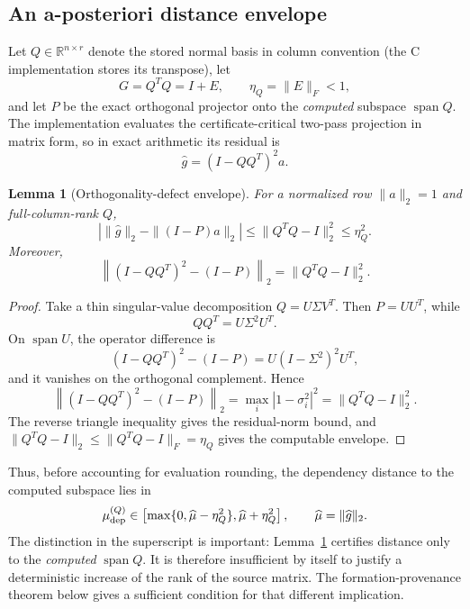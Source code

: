 \documentclass[11pt]{article}
\newtheorem{lemma}[theorem]{Lemma}
\theoremstyle{definition}
\newcommand{\R}{\mathbb{R}}
\begin{document}
\subsection{An a-posteriori distance envelope}
Let $Q\in\R^{n\times r}$ denote the stored normal basis in column convention (the C implementation stores its transpose), let
\[
G=Q^TQ=I+E,\qquad \eta_Q=\|E\|_F<1,
\]
and let $P$ be the exact orthogonal projector onto the \emph{computed} subspace $\operatorname{span}Q$. The implementation evaluates the certificate-critical two-pass projection in matrix form, so in exact arithmetic its residual is
\[
\widehat g=(I-QQ^T)^2a.
\]

\begin{lemma}[Orthogonality-defect envelope]\label{lem:orth-envelope}
For a normalized row $\|a\|_2=1$ and full-column-rank $Q$,
\[
\left|\|\widehat g\|_2-\|(I-P)a\|_2\right|
\le
\|Q^TQ-I\|_2^2
\le \eta_Q^2.
\]
Moreover,
\[
\left\|(I-QQ^T)^2-(I-P)\right\|_2
=
\|Q^TQ-I\|_2^2.
\]
\end{lemma}

\begin{proof}
Take a thin singular-value decomposition $Q=U\Sigma V^T$. Then $P=UU^T$, while
\[
QQ^T=U\Sigma^2U^T.
\]
On $\operatorname{span}U$, the operator difference is
\[
(I-QQ^T)^2-(I-P)
=U(I-\Sigma^2)^2U^T,
\]
and it vanishes on the orthogonal complement. Hence
\[
\left\|(I-QQ^T)^2-(I-P)\right\|_2
=\max_i |1-\sigma_i^2|^2
=\|Q^TQ-I\|_2^2.
\]
The reverse triangle inequality gives the residual-norm bound, and $\|Q^TQ-I\|_2\le\|Q^TQ-I\|_F=\eta_Q$ gives the computable envelope.
\end{proof}

Thus, before accounting for evaluation rounding, the dependency distance to the computed subspace lies in
\[
\mu_{\rm dep}^{(Q)}
\in
\left[\max\{0,\widehat\mu-\eta_Q^2\},
   \widehat\mu+\eta_Q^2\right],
\qquad \widehat\mu=\|\widehat g\|_2.
\]
The distinction in the superscript is important: Lemma~\ref{lem:orth-envelope} certifies distance only to the \emph{computed} $\operatorname{span}Q$. It is therefore insufficient by itself to justify a deterministic increase of the rank of the source matrix. The formation-provenance theorem below gives a sufficient condition for that different implication.
\end{document}
